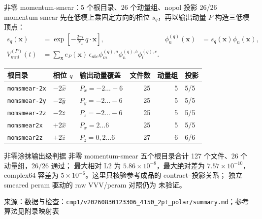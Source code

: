 \documentclass[UTF8,aspectratio=169,11pt]{ctexbeamer}
\newcommand{\source}[1]{\vspace{0.05em}\par{\raggedright\scriptsize\color{muted}来源：#1\par}}
\newcommand{\codepath}[1]{\nolinkurl{#1}}
\newcommand{\unverified}{\textcolor{warning}{未验证}}
\begin{document}
\begin{frame}[t]{非零 momentum-smear：5 个根目录、26 个动量组、nopol 投影 26/26}
  \scriptsize
  momentum smear 先在低模上乘固定方向的相位 $s_q$，再以输出动量 $P$ 构造三低模顶点：
  \begin{align*}
    s_q(\boldsymbol x)&=\exp\!\left[-\frac{2\pi i}{N_x}\,q\!\cdot\!\boldsymbol x\right],
    &\phi_n^{(q)}(\boldsymbol x)&=s_q(\boldsymbol x)\phi_n(\boldsymbol x),\\
    V^{(P)}_{mnl}(t)&=\sum_{\boldsymbol x}e_P(\boldsymbol x)\,
      \epsilon_{abc}\phi_m^{(q),a}\phi_n^{(q),b}\phi_l^{(q),c}.
  \end{align*}
  \setlength{\tabcolsep}{3pt}
  \renewcommand{\arraystretch}{1.02}
  \begin{tabular}{@{}l l l r r l@{}}
    \toprule
    根目录 & 相位 $q$ & 输出动量覆盖 & 文件数 & 动量组 & 投影\\
    \midrule
    \codepath{momsmear-2x} & $-2\hat x$ & $P_x=-2\ldots-6$ & 25 & 5 & 5/5\\
    \codepath{momsmear-2y} & $-2\hat y$ & $P_y=-2\ldots-6$ & 25 & 5 & 5/5\\
    \codepath{momsmear-2z} & $-2\hat z$ & $P_z=-2\ldots-6$ & 25 & 5 & 5/5\\
    \codepath{momsmear2x} & $+2\hat x$ & $P_x=2\ldots6$ & 25 & 5 & 5/5\\
    \codepath{momsmear2z} & $+2\hat z$ & $P_z=0,2\ldots6$ & 27 & 6 & 6/6\\
    \bottomrule
  \end{tabular}
  \vspace{0.10em}
  \begin{block}{非零涂抹输出级判据}
    非零 momentum-smear 五个根目录合计 127 个文件、26 个动量组，26/26 通过；
    最大相对 L2 为 $5.86\times10^{-8}$，最大绝对差为 $7.57\times10^{-10}$，
    complex64 容差为 $5\times10^{-6}$。这里只核验参考成品的 contract--投影关系；
    独立 smeared peram 驱动的 raw VVV/peram 对照仍为 \unverified。
  \end{block}
  \source{数据与检查：\codepath{cmp1/v20260830123306_4150_2pt_polar/summary.md}；参考算法见附录映射表}
\end{frame}
\end{document}
